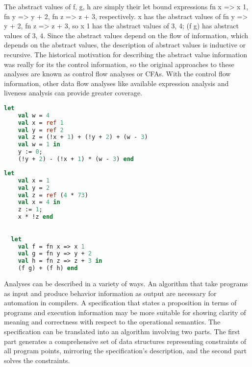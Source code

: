 \documentclass{article}
\begin{document}
The abstract values of f, g, h are simply their let bound expressions {fn x => x 1},
{fn y => y + 2},  {fn z => z + 3}, respectively.  x has the abstract values of
{fn y => y + 2, fn z => z + 3}, so x 1 has the abstract values of {3, 4}; (f g) has abstract
values of {3, 4}.  Since the abstract values depend on the flow of information, which depends
on the abstract values, the description of abstract values is inductive or recursive.  The
historical motivation for describing the abstract value information was really for its the
control information, so the original approaches to these analyses are known as control flow
analyses or CFAs.  With the control flow information, other data flow analyses like available
expression analysis and liveness analysis can provide greater coverage.


\begin{lstlisting}[language=ML, style=codestyle1, escapechar=\%]
  let
    val w = 4
    val x = ref 1
    val y = ref 2
    val z = (!x + 1) + (!y + 2) + (w - 3)
    val w = 1 in
    y := 0;
    (!y + 2) - (!x + 1) * (w - 3) end
  \end{lstlisting}

\begin{lstlisting}[language=ML, style=codestyle1, escapechar=\%]
  let 
    val x = 1  
    val y = 2
    val z = ref (4 * 73)
    val x = 4 in 
    z := 1; 
    x * !z end
  \end{lstlisting}

\begin{lstlisting}[language=ML, style=codestyle1, escapechar=\%]

  let 
    val f = fn x => x 1
    val g = fn y => y + 2
    val h = fn z => z + 3 in 
    (f g) + (f h) end

\end{lstlisting}




Analyses can be described in a variety of ways.  An algorithm that take programs as input and
produce behavior information as output are necessary for automation in compilers.  A
specification that states a proposition in terms of programs and execution information may be
more suitable for showing clarity of meaning and correctness with respect to the operational
semantics.  The specification can be translated into an algorithm involving two parts.  The
first part generates a comprehensive set of data structures representing constraints of all
program points, mirroring the specification's description, and the second part solves the
constraints.
\end{document}
